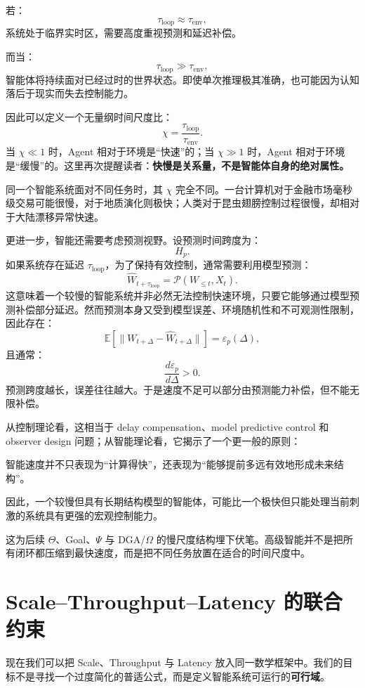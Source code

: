 若：
\[
\tau_{\mathrm{loop}}
\approx
\tau_{\mathrm{env}},
\]
系统处于临界实时区，需要高度重视预测和延迟补偿。

而当：
\[
\tau_{\mathrm{loop}}
\gg
\tau_{\mathrm{env}},
\]
智能体将持续面对已经过时的世界状态。即使单次推理极其准确，也可能因为认知落后于现实而失去控制能力。

因此可以定义一个无量纲时间尺度比：
\[
\boxed{
\chi
=
\frac{\tau_{\mathrm{loop}}}
{\tau_{\mathrm{env}}}.
}
\]
当 $\chi\ll1$ 时，Agent 相对于环境是“快速”的；当 $\chi\gg1$ 时，Agent 相对于环境是“缓慢”的。这里再次提醒读者：\textbf{快慢是关系量，不是智能体自身的绝对属性。}

同一个智能系统面对不同任务时，其 $\chi$ 完全不同。一台计算机对于金融市场毫秒级交易可能很慢，对于地质演化则极快；人类对于昆虫翅膀控制过程很慢，却相对于大陆漂移异常快速。

更进一步，智能还需要考虑预测视野。设预测时间跨度为：
\[
H_p.
\]
如果系统存在延迟 $\tau_{\mathrm{loop}}$，为了保持有效控制，通常需要利用模型预测：
\[
\hat W_{t+\tau_{\mathrm{loop}}}
=
\mathcal P(W_{\leq t},X_t).
\]
这意味着一个较慢的智能系统并非必然无法控制快速环境，只要它能够通过模型预测补偿部分延迟。然而预测本身又受到模型误差、环境随机性和不可观测性限制，因此存在：
\[
\mathbb E
\left[
\|W_{t+\Delta}
-
\hat W_{t+\Delta}\|
\right]
=
\varepsilon_p(\Delta),
\]
且通常：
\[
\frac{d\varepsilon_p}{d\Delta}>0.
\]
预测跨度越长，误差往往越大。于是速度不足可以部分由预测能力补偿，但不能无限补偿。

从控制理论看，这相当于 delay compensation、model predictive control 和 observer design 问题；从智能理论看，它揭示了一个更一般的原则：

\begin{proposition*}
智能速度并不只表现为“计算得快”，还表现为“能够提前多远有效地形成未来结构”。
\end{proposition*}

因此，一个较慢但具有长期结构模型的智能体，可能比一个极快但只能处理当前刺激的系统具有更强的宏观控制能力。

这为后续 $\Theta$、Goal、$\Psi$ 与 DGA/$\Omega$ 的慢尺度结构埋下伏笔。高级智能并不是把所有闭环都压缩到最快速度，而是把不同任务放置在适合的时间尺度中。

\section{Scale--Throughput--Latency 的联合约束}

现在我们可以把 Scale、Throughput 与 Latency 放入同一数学框架中。我们的目标不是寻找一个过度简化的普适公式，而是定义智能系统可运行的\textbf{可行域}。

